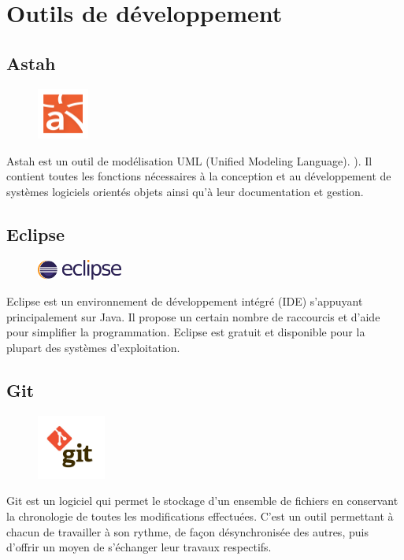 
    \chapter{Outils de développement}
\section{Astah}
\begin{figure}[h!]  
 \centering
    \includegraphics[width=0.15\textwidth]{annexe/Figures/astah.png}
\end{figure}
Astah est un outil de modélisation UML (Unified Modeling Language). ). Il contient toutes les fonctions nécessaires à la conception et au développement de systèmes logiciels orientés objets ainsi qu'à leur documentation et gestion.

\section{Eclipse}
\begin{figure}[h!]  
 \centering
    \includegraphics[width=0.25\textwidth]{annexe/Figures/eclipse.png}
\end{figure}
Eclipse est un environnement de développement intégré (IDE) s'appuyant principalement sur Java. Il propose un certain nombre de raccourcis et d'aide pour simplifier la programmation. Eclipse est gratuit et disponible pour la plupart des systèmes d'exploitation.

\newpage

\section{Git}
\begin{figure}[h!]  
 \centering
    \includegraphics[width=0.2\textwidth]{annexe/Figures/git.png}
\end{figure}
Git est un logiciel qui permet le stockage d'un ensemble de fichiers en conservant la chronologie de toutes les modifications effectuées. C'est un outil permettant à chacun de travailler à son rythme, de façon désynchronisée des autres, puis d'offrir un moyen de s'échanger leur travaux respectifs.

